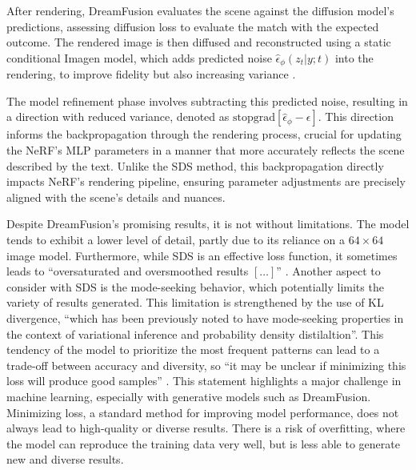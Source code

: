 After rendering, DreamFusion evaluates the scene against the diffusion model's predictions, assessing diffusion loss to evaluate the match with the expected outcome. The rendered image is then diffused and reconstructed using a static conditional Imagen model, which adds predicted noise \( \hat{\epsilon}_\phi(z_t | y; t) \) into the rendering, to improve fidelity but also increasing variance \citep{pooleDreamfusion}.

The model refinement phase involves subtracting this predicted noise, resulting in a direction with reduced variance, denoted as \( \text{stopgrad}[\hat{\epsilon}_\phi - \epsilon] \). This direction informs the backpropagation through the rendering process, crucial for updating the NeRF's MLP parameters in a manner that more accurately reflects the scene described by the text. Unlike the SDS method, this backpropagation directly impacts NeRF's rendering pipeline, ensuring parameter adjustments are precisely aligned with the scene's details and nuances.

Despite DreamFusion's promising results, it is not without limitations. The model tends to exhibit a lower level of detail, partly due to its reliance on a \( 64 \times 64 \) image model. Furthermore, while SDS is an effective loss function, it sometimes leads to ``oversaturated and oversmoothed results \([\ldots]\)'' \citep{pooleDreamfusion}. Another aspect to consider with SDS is the mode-seeking behavior, which potentially limits the variety of results generated. This limitation is strengthened by the use of KL divergence, ``which has been previously noted to have mode-seeking properties in the context of variational inference and probability density distilaltion''\citep{pooleDreamfusion}. This tendency of the model to prioritize the most frequent patterns can lead to a trade-off between accuracy and diversity, so ``it may be unclear if minimizing this loss will produce good samples'' \citep{pooleDreamfusion}. This statement highlights a major challenge in machine learning, especially with generative models such as DreamFusion. Minimizing loss, a standard method for improving model performance, does not always lead to high-quality or diverse results. There is a risk of overfitting, where the model can reproduce the training data very well, but is less able to generate new and diverse results.